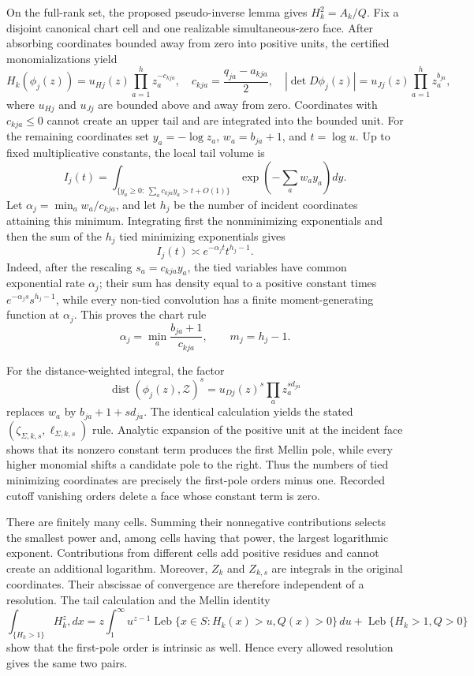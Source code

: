 On the full-rank set, the proposed pseudo-inverse lemma gives \(H_k^2=A_k/Q\). Fix a disjoint canonical chart cell and one realizable simultaneous-zero face. After absorbing coordinates bounded away from zero into positive units, the certified monomializations yield
\[
H_k(\phi_j(z))
=u_{Hj}(z)\prod_{a=1}^h z_a^{-c_{kja}},
\quad
c_{kja}=\frac{q_{ja}-a_{kja}}2,
\quad
|\det D\phi_j(z)|=u_{Jj}(z)\prod_{a=1}^h z_a^{b_{ja}},
\]
where \(u_{Hj}\) and \(u_{Jj}\) are bounded above and away from zero. Coordinates with \(c_{kja}\le0\) cannot create an upper tail and are integrated into the bounded unit. For the remaining coordinates set \(y_a=-\log z_a\), \(w_a=b_{ja}+1\), and \(t=\log u\). Up to fixed multiplicative constants, the local tail volume is
\[
I_j(t)=\int_{\{y_a\ge0:\ \sum_ac_{kja}y_a>t+O(1)\}}
\exp\!\left(-\sum_aw_ay_a\right)dy.
\]
Let \(\alpha_j=\min_a w_a/c_{kja}\), and let \(h_j\) be the number of incident coordinates attaining this minimum. Integrating first the nonminimizing exponentials and then the sum of the \(h_j\) tied minimizing exponentials gives
\[
I_j(t)\asymp e^{-\alpha_jt}t^{h_j-1}.
\]
Indeed, after the rescaling \(s_a=c_{kja}y_a\), the tied variables have common exponential rate \(\alpha_j\); their sum has density equal to a positive constant times \(e^{-\alpha_j s}s^{h_j-1}\), while every non-tied convolution has a finite moment-generating function at \(\alpha_j\). This proves the chart rule
\[
\alpha_j=\min_a\frac{b_{ja}+1}{c_{kja}},
\qquad m_j=h_j-1.
\]

For the distance-weighted integral, the factor
\[
\operatorname{dist}(\phi_j(z),\mathcal Z)^s
=u_{Dj}(z)^s\prod_a z_a^{s d_{ja}}
\]
replaces \(w_a\) by \(b_{ja}+1+s d_{ja}\). The identical calculation yields the stated \((\zeta_{\Sigma,k,s},\ell_{\Sigma,k,s})\) rule. Analytic expansion of the positive unit at the incident face shows that its nonzero constant term produces the first Mellin pole, while every higher monomial shifts a candidate pole to the right. Thus the numbers of tied minimizing coordinates are precisely the first-pole orders minus one. Recorded cutoff vanishing orders delete a face whose constant term is zero.

There are finitely many cells. Summing their nonnegative contributions selects the smallest power and, among cells having that power, the largest logarithmic exponent. Contributions from different cells add positive residues and cannot create an additional logarithm. Moreover, \(Z_k\) and \(Z_{k,s}\) are integrals in the original coordinates. Their abscissae of convergence are therefore independent of a resolution. The tail calculation and the Mellin identity
\[
\int_{\{H_k>1\}}H_k^z,dx
=z\int_1^\infty u^{z-1}\operatorname{Leb}\{x\in S:H_k(x)>u,Q(x)>0\}\,du
+\operatorname{Leb}\{H_k>1,Q>0\}
\]
show that the first-pole order is intrinsic as well. Hence every allowed resolution gives the same two pairs.

